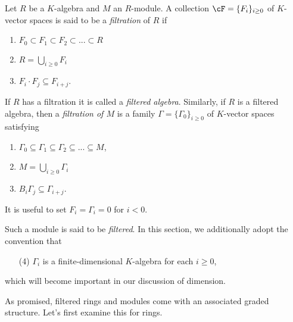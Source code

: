 \begin{defn}\label{defn:filtered-ring}
	Let $R$ be a $K$-algebra and $M$ an $R$-module. A collection $\cF = \{F_i\}_{i \geq 0}$ of $K$-vector spaces is said to be a \emph{filtration} of $R$ if
	\begin{enumerate}[(1)]
		\item $F_0\subset F_1 \subset F_2 \subset ... \subset R$
		\item $R = \bigcup_{i\geq 0} F_i$
		\item $F_i\cdot F_j \subseteq F_{i+j}$.
	\end{enumerate}
	If $R$ has a filtration it is called a \emph{filtered algebra}. Similarly, if $R$ is a filtered algebra, then a \emph{filtration of $M$} is a family $\Gamma = \{\Gamma_0\}_{i\geq 0}$ of $K$-vector spaces satisfying
	\begin{enumerate}[(1)]
		\item $\Gamma_0 \subseteq \Gamma_1 \subseteq \Gamma_2 \subseteq ... \subseteq M$,
		\item $M = \bigcup_{i\geq 0} \Gamma_i$
		\item $B_i\Gamma_j \subseteq \Gamma_{i+j}$.
	\end{enumerate}
	It is useful to set $F_i = \Gamma_i = 0$ for $i < 0$.
\end{defn}
Such a module is said to be \emph{filtered}. In this section, we additionally adopt the convention that
\begin{enumerate}
	\item[(4)] $\Gamma_i$ is a finite-dimensional $K$-algebra for each $i \geq 0$,
\end{enumerate}
which will become important in our discussion of dimension.

As promised, filtered rings and modules come with an associated graded structure. Let's first examine this for rings.

